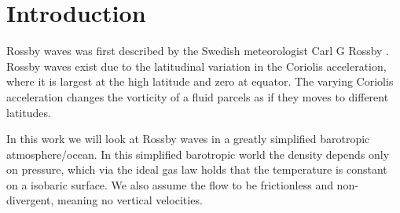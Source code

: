 \section{Introduction}
Rossby waves was first described by the Swedish meteorologist Carl G Rossby
\parencite{Rossby1939}. Rossby waves exist due to the latitudinal variation in
the Coriolis acceleration, where it is largest at the high latitude and zero at
equator. The varying Coriolis acceleration changes the vorticity of a fluid
parcels as if they moves to different latitudes. 

In this work we will look at Rossby waves in a greatly simplified barotropic 
atmosphere/ocean. In this simplified barotropic world the density depends only
on pressure, which via the ideal gas law holds that the temperature is constant
on a isobaric surface. We also assume the flow to be frictionless and
non-divergent, meaning no vertical velocities. 